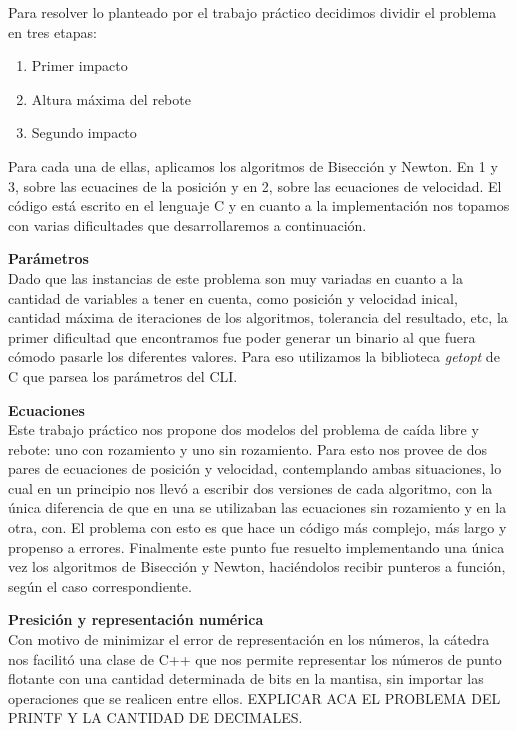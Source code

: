 \documentclass[a4paper]{article}
\begin{document}
Para resolver lo planteado por el trabajo práctico decidimos dividir el problema en tres etapas:
\begin{enumerate}
\item Primer impacto
\item Altura máxima del rebote
\item Segundo impacto
\end{enumerate}
Para cada una de ellas, aplicamos los algoritmos de Bisección y Newton. En 1 y 3, sobre las ecuacines de la posición y en 2, sobre las ecuaciones de velocidad.
El código está escrito en el lenguaje C y en cuanto a la implementación nos topamos con varias dificultades que desarrollaremos a continuación.
\begin{description}
\item \textbf{Parámetros}\\
Dado que las instancias de este problema son muy variadas en cuanto a la cantidad de variables a tener en cuenta, como posición y velocidad inical, cantidad máxima de iteraciones de los algoritmos, tolerancia del resultado, etc, la primer dificultad que encontramos fue poder generar un binario al que fuera cómodo pasarle los diferentes valores. Para eso utilizamos la biblioteca \textit{getopt} de C que parsea los parámetros del CLI.
\item \textbf{Ecuaciones}\\
Este trabajo práctico nos propone dos modelos del problema de caída libre y rebote: uno con rozamiento y uno sin rozamiento. Para esto nos provee de dos pares de ecuaciones de posición y velocidad, contemplando ambas situaciones, lo cual en un principio nos llevó a escribir dos versiones de cada algoritmo, con la única diferencia de que en una se utilizaban las ecuaciones sin rozamiento y en la otra, con.
El problema con esto es que hace un código más complejo, más largo y propenso a errores. Finalmente este punto fue resuelto implementando una única vez los algoritmos de Bisección y Newton, haciéndolos recibir punteros a función, según el caso correspondiente.
\item \textbf{Presición y representación numérica}\\
Con motivo de minimizar el error de representación en los números, la cátedra nos facilitó una clase de C++ que nos permite representar los números de punto flotante con una cantidad determinada de bits en la mantisa, sin importar las operaciones que se realicen entre ellos. EXPLICAR ACA EL PROBLEMA DEL PRINTF Y LA CANTIDAD DE DECIMALES.

\end{description} 
\end{document}
